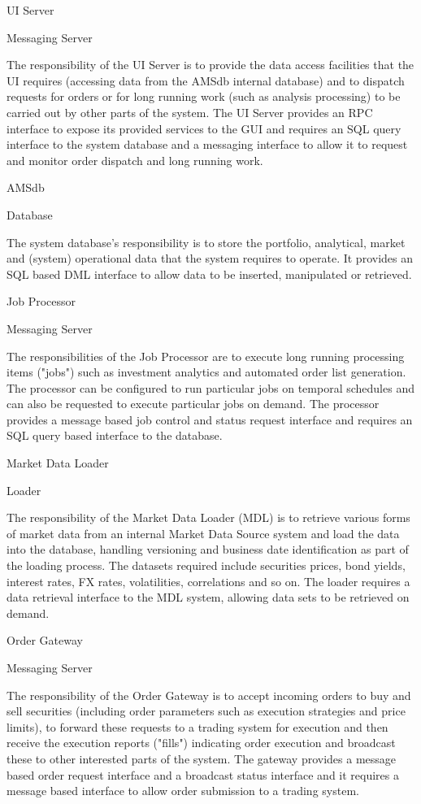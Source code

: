 \begin{itemise}
UI Server

Messaging Server

The responsibility of the UI Server is to provide the data access facilities that the UI requires (accessing data from the AMSdb internal database) and to dispatch requests for orders or for long running work (such as analysis processing) to be carried out by other parts of the system.  The UI Server provides an RPC interface to expose its provided services to the GUI and requires an SQL query interface to the system database and a messaging interface to allow it to request and monitor order dispatch and long running work.

AMSdb

Database

The system database's responsibility is to store the portfolio, analytical, market and (system) operational data that the system requires to operate.  It provides an SQL based DML interface to allow data to be inserted, manipulated or retrieved.

Job Processor

Messaging Server

The responsibilities of the Job Processor are to execute long running processing items ("jobs") such as investment analytics and automated order list generation.  The processor can be configured to run particular jobs on temporal schedules and can also be requested to execute particular jobs on demand.  The processor provides a message based job control and status request interface and requires an SQL query based interface to the database.

Market Data Loader

Loader

The responsibility of the Market Data Loader (MDL) is to retrieve various forms of market data from an internal Market Data Source system and load the data into the database, handling versioning and business date identification as part of the loading process.  The datasets required include securities prices, bond yields, interest rates, FX rates, volatilities, correlations and so on.  The loader requires a data retrieval interface to the MDL system, allowing data sets to be retrieved on demand.

Order Gateway 

Messaging Server

The responsibility of the Order Gateway is to accept incoming orders to buy and sell securities (including order parameters such as execution strategies and price limits), to forward these requests to a trading system for execution and then receive the execution reports ("fills") indicating order execution and broadcast these to other interested parts of the system.  The gateway provides a message based order request interface and a broadcast status interface and it requires a message based interface to allow order submission to a trading system.


\end{itemise}
